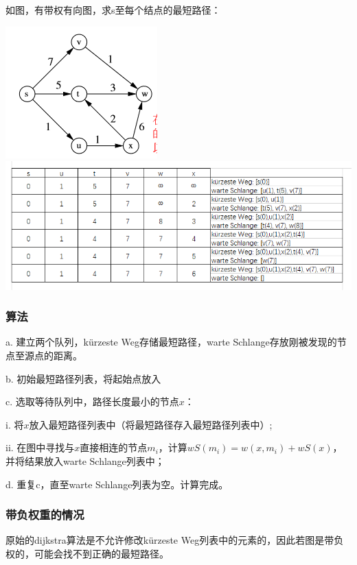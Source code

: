 \documentclass[a4paper]{article}    %
\begin{document}
\noindent 如图，有带权有向图，求s至每个结点的最短路径：

\begin{center}
    \includegraphics[scale=0.6]{21.png}\qquad
    \includegraphics[scale=0.6]{22.png}
\end{center}

\subsubsection{算法} 

a. 建立两个队列，kürzeste Weg存储最短路径，warte Schlange存放刚被发现的节点至源点的距离。

b. 初始最短路径列表，将起始点放入

c. 选取等待队列中，路径长度最小的节点$x$：
    
\indent\indent i. 将$x$放入最短路径列表中（将最短路径存入最短路径列表中）; 

\indent\indent ii. 在图中寻找与$x$直接相连的节点$m_i$，计算$wS(m_i) = w(x,m_i)+wS(x)$，并将结果放入warte Schlange列表中；

d. 重复c，直至warte Schlange列表为空。计算完成。

\subsubsection{带负权重的情况}

原始的dijkstra算法是不允许修改kürzeste Weg列表中的元素的，因此若图是带负权的，可能会找不到正确的最短路径。
\end{document}
